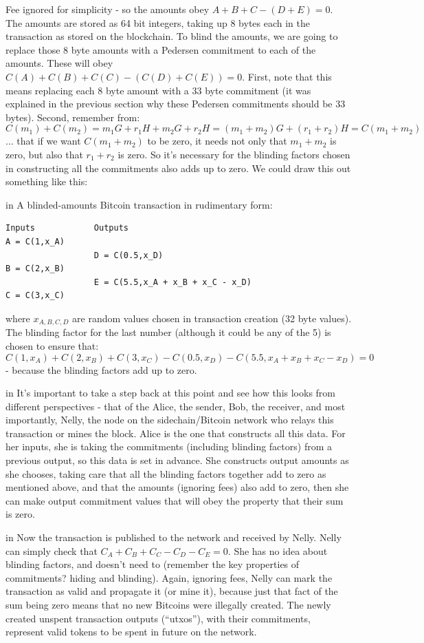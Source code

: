\documentclass[10pt,a4paper]{article}
\begin{document}
Fee ignored for simplicity - so the amounts obey $A + B + C - (D + E) = 0$. The amounts are stored as 64 bit integers, taking up 8 bytes each in the transaction as stored on the blockchain. To blind the amounts, we are going to replace those 8 byte amounts with a Pedersen commitment to each of the amounts. These will obey $C(A) + C(B) + C(C) - (C(D) + C(E)) = 0$. First, note that this means replacing each 8 byte amount with a 33 byte commitment (it was explained in the previous section why these Pedersen commitments should be 33 bytes). Second, remember from:
\[C(m_1) + C(m_2) = m_{1}G + r_{1}H + m_{2}G +r_{2}H = (m_1+m_2)G +(r_1 + r_2)H = C(m_1+m_2) \]
... that if we want $C(m_1 + m_2 )$ to be zero, it needs not only that $m_1 + m_2 $ is zero, but also that $r_1 + r_2 $ is zero. So it's necessary for the blinding factors chosen in constructing all the commitments also adds up to zero. We could draw this out something like this:

 in \noindent A blinded-amounts Bitcoin transaction in rudimentary form:
\begin{verbatim}
Inputs            Outputs
A = C(1,x_A)
                  D = C(0.5,x_D)
B = C(2,x_B)
                  E = C(5.5,x_A + x_B + x_C - x_D)
C = C(3,x_C)
\end{verbatim}

where $x_{A,B,C,D}$ are random values chosen in transaction creation (32 byte values). The blinding factor for the last number (although it could be any of the 5) is chosen to ensure that:
\[C(1,x_A) + C(2,x_B) + C(3,x_C) - C(0.5,x_D) - C(5.5,x_A + x_B + x_C - x_D) = 0\]
- because the blinding factors add up to zero.

 in \noindent It's important to take a step back at this point and see how this looks from different perspectives - that of the Alice, the sender, Bob, the receiver, and most importantly, Nelly, the node on the sidechain/Bitcoin network who relays this transaction or mines the block. Alice is the one that constructs all this data. For her inputs, she is taking the commitments (including blinding factors) from a previous output, so this data is set in advance. She constructs output amounts as she chooses, taking care that all the blinding factors together add to zero as mentioned above, and that the amounts (ignoring fees) also add to zero, then she can make output commitment values that will obey the property that their sum is zero.

 in \noindent Now the transaction is published to the network and received by Nelly. Nelly can simply check that $C_A + C_B + C_C - C_D - C_E = 0$. She has no idea about blinding factors, and doesn't need to (remember the key properties of commitments? hiding and blinding). Again, ignoring fees, Nelly can mark the transaction as valid and propagate it (or mine it), because just that fact of the sum being zero means that no new Bitcoins were illegally created. The newly created unspent transaction outputs (``utxos''), with their commitments, represent valid tokens to be spent in future on the network.
\end{document}
